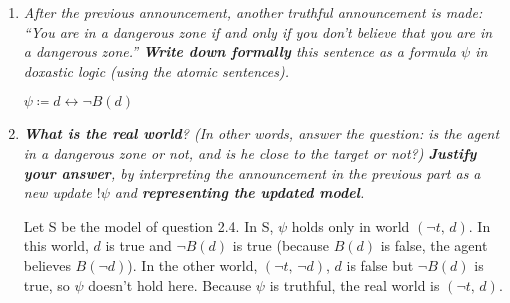 \documentclass[leqno]{article}
\begin{document}
\begin{enumerate}
    \begin{center}
    \end{center}

    \item \textit{After the previous announcement, another truthful
    announcement is made: ``You are in a dangerous zone if and only if you
    don't believe that you are in a dangerous zone.'' \textbf{Write down
    formally} this sentence as a formula $\psi$ in doxastic logic (using the
    atomic sentences).}

    $\psi \coloneqq d \leftrightarrow \neg B(d)$

    \item \textit{\textbf{What is the real world}? (In other words, answer the
    question: is the agent in a dangerous zone or not, and is he close to the
    target or not?) \textbf{Justify your answer}, by interpreting the
    announcement in the previous part as a new update $!\psi$ and
    \textbf{representing the updated model}.}

	Let S be the model of question 2.4. In S, $\psi$ holds only in world
	$(\neg t, \, d)$. In this world, $d$ is true and $\neg B(d)$ is true (because
	$B(d)$ is false, the agent believes $B(\neg d)$). In the other world,
	$(\neg t, \, \neg d)$, $d$ is false but $\neg B(d)$ is true, so $\psi$ doesn't
	 hold here. Because $\psi$ is truthful, the real world is $(\neg t, \, d)$.


\end{enumerate}
\end{document}
